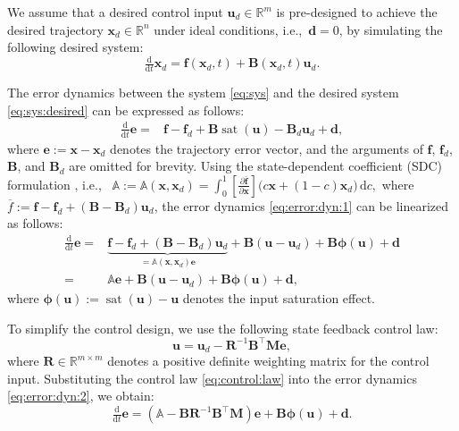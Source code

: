 \documentclass{ifacconf}
\newcommand\ie{\textrm{i.e.,\ }}
\newcommand\R{\mathbb{R}}
\newcommand*{\mv}[1]{\boldsymbol{#1}} %
\newcommand*{\mm}[1]{\boldsymbol{#1}} %
\DeclareMathOperator{\mysat}{{sat}}       %
\newcommand\der{\mathrm d}
\newcommand*{\ddtt}{
   \tfrac{\der}{\der t}
}
\newcommand*{\pptfrac}[2]{
   \tfrac{\partial {#1}}{\partial {#2}}
}
\begin{document}
We assume that a desired control input $\mv{u}_d\in\R^m$ is pre-designed to achieve the desired trajectory $\mv{x}_d\in\R^n$ under ideal conditions, \ie $\mv{d}=0$, by simulating the following desired system:
\begin{equation} \label{eq:sys:desired}
   \ddtt\mv{x}_d   =
   \mv{f}(\mv{x}_d, t)   
   +
   \mm{B}(\mv{x}_d,t) \mv{u}_d
   .
\end{equation}

The error dynamics between the system \eqref{eq:sys} and the desired system \eqref{eq:sys:desired} can be expressed as follows:
\begin{equation} \label{eq:error:dyn:1}
   \begin{aligned}
      \ddtt\mv{e}
      =&
      \mv{f}-\mv{f}_d
      + \mm{B} \mysat(\mv{u})
      - \mm{B}_d \mv{u}_d
      + \mv{d}
      ,
   \end{aligned}
\end{equation}
where $\mv{e}:=\mv{x}-\mv{x}_d$ denotes the trajectory error vector, and the arguments of $\mv{f}$, $\mv{f}_d$, $\mm{B}$, and $\mm{B}_d$ are omitted for brevity.
Using the state-dependent coefficient (SDC) formulation \cite{Dani:2015aa}, \ie 
$
   \mathbb{A}
   :=
   \mathbb{A}(\mv{x},\mv{x}_d)
   =
   \int_0^1 
   \left[
      \pptfrac{\overline{\mv{f}}}{\mv{x}}
   \right]
   \big(
      c \mv{x} + (1-c) \mv{x}_d
   \big)
   \,\der c
   ,
$
where $\overline{f}:=\mv{f}-\mv{f}_d+(\mm{B}-\mm{B}_d)\mv{u}_d$, the error dynamics \eqref{eq:error:dyn:1} can be linearized as follows:
\begin{equation} \label{eq:error:dyn:2}
   \begin{aligned}
      \ddtt\mv{e}
      =&
      \underbrace
      {
         \mv{f}-\mv{f}_d
         +
         (
            \mm{B} 
            - \mm{B}_d 
         ) \mv{u}_d
      }_{= \mathbb{A}(\mv{x},\mv{x}_d) \mv{e}}
      + \mm{B} 
      (
         \mv{u} - \mv{u}_d
      )
      + \mm{B} \mv{\phi}(\mv{u}) + \mv{d}
      \\
      =&
      \mathbb{A} \mv{e}
      + \mm{B} 
      (\mv{u} - \mv{u}_d)
      + \mm{B} \mv{\phi}(\mv{u}) + \mv{d}
      ,
   \end{aligned}
\end{equation}
where $\mv{\phi}(\mv{u}):=\mysat(\mv{u}) - \mv{u}$ denotes the input saturation effect.

To simplify the control design, we use the following state feedback control law:
\begin{equation} \label{eq:control:law}
   \mv{u}
   =
   \mv{u}_d
   -
   \mm{R}^{-1} \mm{B}^\top \mm{M}
   \mv{e}
   ,
\end{equation}
where $\mm{R}\in\R^{m\times m}$ denotes a positive definite weighting matrix for the control input.
Substituting the control law \eqref{eq:control:law} into the error dynamics \eqref{eq:error:dyn:2}, we obtain:
\begin{equation} \label{eq:error:dyn:3}
   \ddtt\mv{e}
   \!=\!
   \left(
      \mathbb{A} - \mm{B} \mm{R}^{-1} \mm{B} ^\top \mm{M}
   \right)
   \mv{e}
   + \mm{B} \mv{\phi}(\mv{u}) + \mv{d}
   .
\end{equation}
\end{document}
